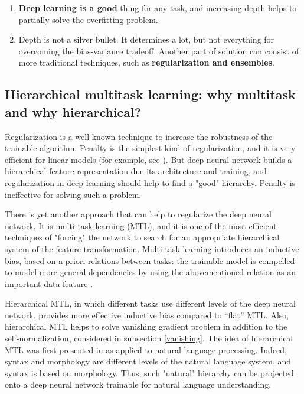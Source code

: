 \documentclass{article}
\begin{document}
\begin{enumerate}
    \item \textbf{Deep learning is a good} thing for any task, and increasing depth helps to partially solve the overfitting problem.
    \item Depth is not a silver bullet. It determines a lot, but not everything for overcoming the bias-variance tradeoff. Another part of solution can consist of more traditional techniques, such as \textbf{regularization and ensembles}.
\end{enumerate}

\subsection{Hierarchical multitask learning: why multitask and why hierarchical?}

Regularization is a well-known technique to increase the robustness of the trainable algorithm. Penalty is the simplest kind of regularization, and it is very efficient for linear models (for example, see \cite{bishop2006}). But deep neural network builds a hierarchical feature representation due its architecture and training, and regularization in deep learning should help to find a "good" hierarchy. Penalty is ineffective for solving such a problem.

There is yet another approach that can help to regularize the deep neural network. It is multi-task learning (MTL), and it is one of the most efficient techniques of "forcing" the network to search for an appropriate hierarchical system of the feature transformation. Multi-task learning introduces an inductive bias, based on a-priori relations between tasks: the trainable model is compelled to model more general dependencies by using the abovementioned relation as an important data feature \cite{caruana1997}.

Hierarchical MTL, in which different tasks use different levels of the deep neural network, provides more effective inductive bias compared to “flat” MTL. Also, hierarchical MTL helps to solve vanishing gradient problem in addition to the self-normalization, considered in subsection \ref{vanishing}. The idea of hierarchical MTL was first presented in \cite{Sgaard2016DeepML} as applied to natural language processing. Indeed, syntax and morphology are different levels of the natural language system, and syntax is based on morphology. Thus, such "natural" hierarchy can be projected onto a deep neural network trainable for natural language understanding.
\end{document}
